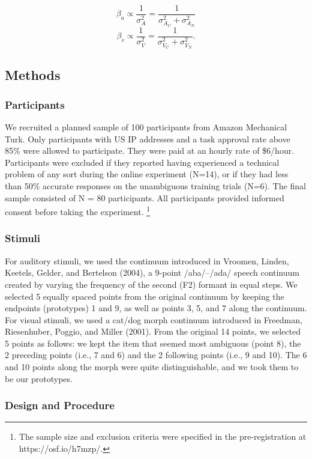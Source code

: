 \documentclass[english,,man,floatsintext]{apa6}
\let\rmarkdownfootnote\footnote%
\def\footnote{\protect\rmarkdownfootnote}
\theoremstyle{definition}
\theoremstyle{definition}
\theoremstyle{definition}
\theoremstyle{remark}
\begin{document}
\[\beta_a \propto \frac{1}{\sigma^2_{A}} = \frac{1}{\sigma^2_{A_C} + \sigma^2_{A_N}}\]
\[\beta_v \propto \frac{1}{\sigma^2_{V}} = \frac{1}{\sigma^2_{V_C} + \sigma^2_{V_N}}.\]

\subsection{Methods}\label{methods}

\subsubsection{Participants}\label{participants}

We recruited a planned sample of 100 participants from Amazon Mechanical
Turk. Only participants with US IP addresses and a task approval rate
above 85\% were allowed to participate. They were paid at an hourly rate
of \$6/hour. Participants were excluded if they reported having
experienced a technical problem of any sort during the online experiment
(N=14), or if they had less than 50\% accurate responses on the
unambiguous training trials (N=6). The final sample consisted of N = 80
participants. All participants provided informed consent before taking
the experiment.
\footnote{The sample size and exclusion criteria were specified in the pre-registration at https://osf.io/h7mzp/.}

\subsubsection{Stimuli}\label{stimuli}

For auditory stimuli, we used the continuum introduced in Vroomen,
Linden, Keetels, Gelder, and Bertelson (2004), a 9-point /aba/--/ada/
speech continuum created by varying the frequency of the second (F2)
formant in equal steps. We selected 5 equally spaced points from the
original continuum by keeping the endpoints (prototypes) 1 and 9, as
well as points 3, 5, and 7 along the continuum. For visual stimuli, we
used a cat/dog morph continuum introduced in Freedman, Riesenhuber,
Poggio, and Miller (2001). From the original 14 points, we selected 5
points as follows: we kept the item that seemed most ambiguous (point
8), the 2 preceding points (i.e., 7 and 6) and the 2 following points
(i.e., 9 and 10). The 6 and 10 points along the morph were quite
distinguishable, and we took them to be our prototypes.

\subsubsection{Design and Procedure}\label{design-and-procedure}
\end{document}
